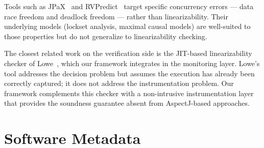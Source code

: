 \documentclass[preprint,12pt]{elsarticle}
\begin{document}
Tools such as JPaX~\cite{HR04} and RVPredict~\cite{HMR14} target specific
concurrency errors --- data race freedom and deadlock freedom --- rather than
linearizability. Their underlying models (lockset analysis, maximal causal
models) are well-suited to those properties but do not generalize to
linearizability checking.

The closest related work on the verification side is the JIT-based
linearizability checker of Lowe~\cite{lowe2017}, which our framework
integrates in the monitoring layer. Lowe's tool addresses the decision
problem but assumes the execution has already been correctly captured; it
does not address the instrumentation problem. Our framework complements
this checker with a non-intrusive instrumentation layer that provides the
soundness guarantee absent from AspectJ-based approaches.



\section*{Software Metadata}
\end{document}
